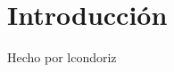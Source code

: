 \documentclass[../main.tex]{subfiles}
\begin{document}
    \section{Introducción} 
        Hecho por lcondoriz
    
\end{document}
